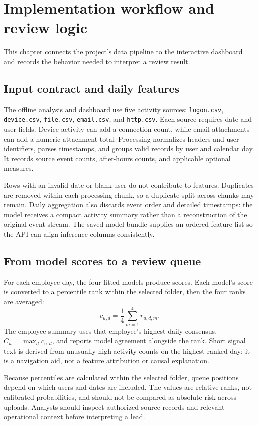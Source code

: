 \documentclass[12pt,a4paper,oneside]{report}
\begin{document}
\chapter{Implementation workflow and review logic}
This chapter connects the project's data pipeline to the interactive
dashboard and records the behavior needed to interpret a review result.

\section{Input contract and daily features}
The offline analysis and dashboard use five activity sources:
\texttt{logon.csv}, \texttt{device.csv}, \texttt{file.csv},
\texttt{email.csv}, and \texttt{http.csv}. Each source requires date
and user fields. Device activity can add a connection count, while email
attachments can add a numeric attachment total. Processing normalizes
headers and user identifiers, parses timestamps, and groups valid
records by user and calendar day. It records source event counts,
after-hours counts, and applicable optional measures.

Rows with an invalid date or blank user do not contribute to features.
Duplicates are removed within each processing chunk, so a duplicate
split across chunks may remain. Daily aggregation also discards event
order and detailed timestamps: the model receives a compact activity
summary rather than a reconstruction of the original event stream. The
saved model bundle supplies an ordered feature list so the API can align
inference columns consistently.

\section{From model scores to a review queue}
For each employee-day, the four fitted models produce scores. Each
model's score is converted to a percentile rank within the selected
folder, then the four ranks are averaged:
\[
c_{u,d}=\frac{1}{4}\sum_{m=1}^{4}r_{u,d,m}.
\]
The employee summary uses that employee's highest daily consensus,
\(C_u=\max_d c_{u,d}\), and reports model agreement alongside the
rank. Short signal text is derived from unusually high activity counts
on the highest-ranked day; it is a navigation aid, not a feature
attribution or causal explanation.

Because percentiles are calculated within the selected folder, queue
positions depend on which users and dates are included. The values are
relative ranks, not calibrated probabilities, and should not be
compared as absolute risk across uploads. Analysts should inspect
authorized source records and relevant operational context before
interpreting a lead.
\end{document}
